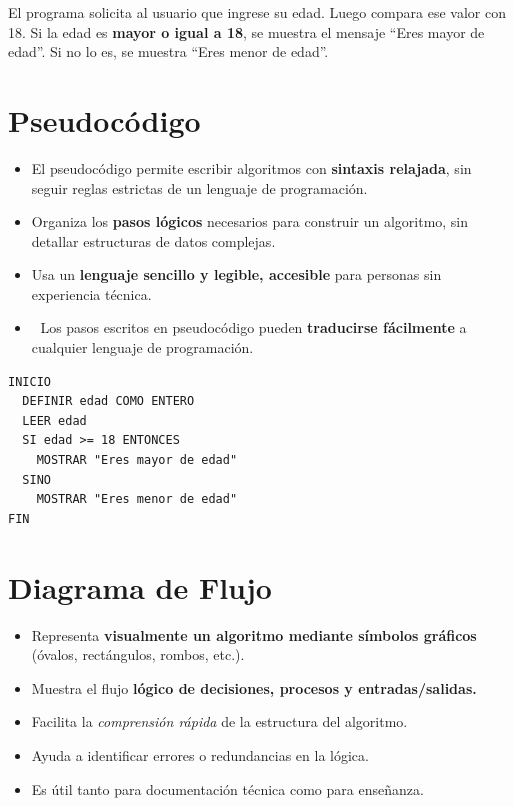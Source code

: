\documentclass[
  spanish,
  12pt,
  letterpaper,
  DIV=11,
  numbers=noendperiod]{scrreprt}
\providecommand{\tightlist}{%
  \setlength{\itemsep}{0pt}\setlength{\parskip}{0pt}}
\begin{document}
\begin{tcolorbox}[enhanced jigsaw, arc=.35mm, bottomrule=.15mm, bottomtitle=1mm, breakable, colback=white, colbacktitle=quarto-callout-note-color!10!white, colframe=quarto-callout-note-color-frame, coltitle=black, left=2mm, leftrule=.75mm, opacityback=0, opacitybacktitle=0.6, rightrule=.15mm, title={Ejemplo de Lenguaje natural}, titlerule=0mm, toprule=.15mm, toptitle=1mm]

El programa solicita al usuario que ingrese su edad. Luego compara ese
valor con 18. Si la edad es \textbf{mayor o igual a 18}, se muestra el
mensaje ``Eres mayor de edad''. Si no lo es, se muestra ``Eres menor de
edad''.

\end{tcolorbox}

\section{\texorpdfstring{\textbf{Pseudocódigo}}{Pseudocódigo}}\label{pseudocuxf3digo}

\begin{itemize}
\tightlist
\item
  El pseudocódigo permite escribir algoritmos con \textbf{sintaxis
  relajada}, sin seguir reglas estrictas de un lenguaje de programación.
\item
  Organiza los \textbf{pasos lógicos} necesarios para construir un
  algoritmo, sin detallar estructuras de datos complejas.
\item
  Usa un \textbf{lenguaje sencillo y legible, accesible} para personas
  sin experiencia técnica.
\item
  🔄 Los pasos escritos en pseudocódigo pueden \textbf{traducirse
  fácilmente} a cualquier lenguaje de programación.
\end{itemize}

\begin{verbatim}
INICIO
  DEFINIR edad COMO ENTERO
  LEER edad
  SI edad >= 18 ENTONCES
    MOSTRAR "Eres mayor de edad"
  SINO
    MOSTRAR "Eres menor de edad"
FIN
\end{verbatim}

\section{\texorpdfstring{\textbf{Diagrama de
Flujo}}{Diagrama de Flujo}}\label{diagrama-de-flujo}

\begin{itemize}
\tightlist
\item
  Representa \textbf{visualmente un algoritmo mediante símbolos
  gráficos} (óvalos, rectángulos, rombos, etc.).
\item
  Muestra el flujo \textbf{lógico de decisiones, procesos y
  entradas/salidas.}
\item
  Facilita la \emph{comprensión rápida} de la estructura del algoritmo.
\item
  Ayuda a identificar errores o redundancias en la lógica.
\item
  Es útil tanto para documentación técnica como para enseñanza.
\end{itemize}
\end{document}
